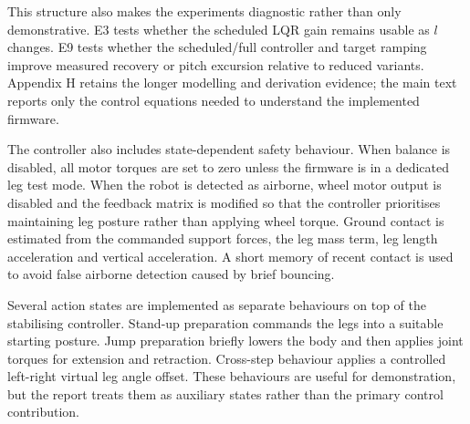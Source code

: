 \documentclass[12pt, a4paper]{article}
\begin{document}
This structure also makes the experiments diagnostic rather than only demonstrative. E3 tests whether the scheduled LQR gain remains usable as \(l\) changes. E9 tests whether the scheduled/full controller and target ramping improve measured recovery or pitch excursion relative to reduced variants. Appendix H retains the longer modelling and derivation evidence; the main text reports only the control equations needed to understand the implemented firmware.

The controller also includes state-dependent safety behaviour. When balance is disabled, all motor torques are set to zero unless the firmware is in a dedicated leg test mode. When the robot is detected as airborne, wheel motor output is disabled and the feedback matrix is modified so that the controller prioritises maintaining leg posture rather than applying wheel torque. Ground contact is estimated from the commanded support forces, the leg mass term, leg length acceleration and vertical acceleration. A short memory of recent contact is used to avoid false airborne detection caused by brief bouncing.

Several action states are implemented as separate behaviours on top of the stabilising controller. Stand-up preparation commands the legs into a suitable starting posture. Jump preparation briefly lowers the body and then applies joint torques for extension and retraction. Cross-step behaviour applies a controlled left-right virtual leg angle offset. These behaviours are useful for demonstration, but the report treats them as auxiliary states rather than the primary control contribution.
\end{document}
